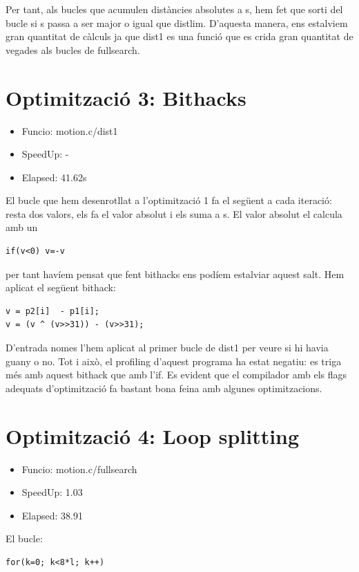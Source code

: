 Per tant, als bucles que acumulen distàncies absolutes a s, hem fet que sorti del bucle si s passa a ser major o igual que distlim. D'aquesta manera, ens estalviem gran quantitat de càlculs ja que dist1 es una funció que es crida gran quantitat de vegades als bucles de fullsearch.

\section{Optimitzaci\'o 3: Bithacks}
\begin{itemize}
\item{Funcio: motion.c/dist1}
\item{SpeedUp: -}
\item{Elapsed: 41.62s}
\end{itemize}

El bucle que hem desenrotllat a l'optimització 1 fa el següent a cada iteració: resta dos valors, els fa el valor absolut i els suma a s. El valor absolut el calcula amb un 

\begin{lstlisting}
if(v<0) v=-v 
\end{lstlisting}

per tant havíem pensat que fent bithacks ens podíem estalviar aquest salt. Hem aplicat el següent bithack:

\begin{lstlisting}
v = p2[i]  - p1[i];
v = (v ^ (v>>31)) - (v>>31);
\end{lstlisting}
 

D'entrada nomes l'hem aplicat al primer bucle de dist1 per veure si hi havia guany o no. Tot i això, el profiling d'aquest programa ha estat negatiu: es triga més amb aquest bithack que amb l'if. Es evident que el compilador amb els flags adequats d'optimització fa bastant bona feina amb algunes optimitzacions.
              

\section{Optimitzaci\'o 4: Loop splitting}
\begin{itemize}
\item{Funcio: motion.c/fullsearch}
\item{SpeedUp: 1.03}
\item {Elapsed: 38.91}
\end{itemize}

El bucle:

\begin{lstlisting}
for(k=0; k<8*l; k++)
\end{lstlisting}

